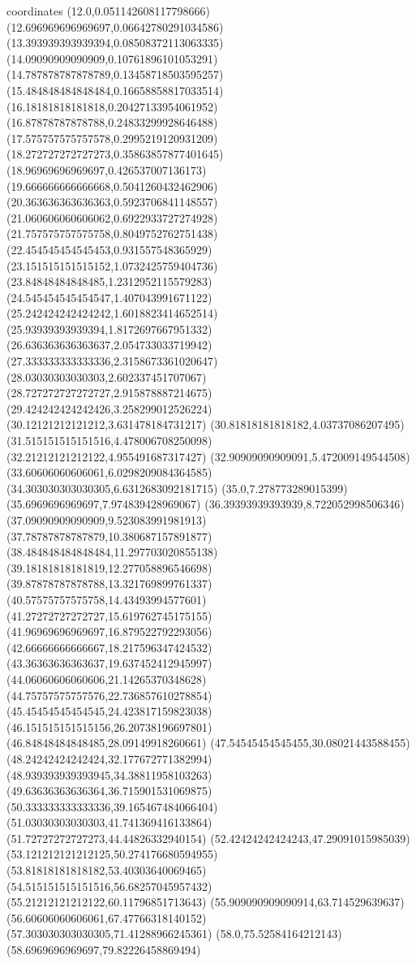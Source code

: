 coordinates {%
(12.0,0.051142608117798666)
(12.696969696969697,0.06642780291034586)
(13.393939393939394,0.08508372113063335)
(14.09090909090909,0.10761896101053291)
(14.787878787878789,0.13458718503595257)
(15.484848484848484,0.16658858817033514)
(16.18181818181818,0.20427133954061952)
(16.87878787878788,0.24833299928646488)
(17.575757575757578,0.2995219120931209)
(18.272727272727273,0.35863857877401645)
(18.96969696969697,0.426537007136173)
(19.666666666666668,0.5041260432462906)
(20.363636363636363,0.5923706841148557)
(21.060606060606062,0.6922933727274928)
(21.757575757575758,0.8049752762751438)
(22.454545454545453,0.931557548365929)
(23.151515151515152,1.0732425759404736)
(23.84848484848485,1.2312952115579283)
(24.545454545454547,1.407043991671122)
(25.242424242424242,1.6018823414652514)
(25.93939393939394,1.8172697667951332)
(26.636363636363637,2.054733033719942)
(27.333333333333336,2.3158673361020647)
(28.03030303030303,2.602337451707067)
(28.727272727272727,2.915878887214675)
(29.424242424242426,3.258299012526224)
(30.12121212121212,3.631478184731217)
(30.81818181818182,4.03737086207495)
(31.515151515151516,4.478006708250098)
(32.21212121212122,4.955491687317427)
(32.90909090909091,5.472009149544508)
(33.60606060606061,6.0298209084364585)
(34.303030303030305,6.6312683092181715)
(35.0,7.278773289015399)
(35.6969696969697,7.974839428969067)
(36.39393939393939,8.722052998506346)
(37.09090909090909,9.523083991981913)
(37.78787878787879,10.380687157891877)
(38.484848484848484,11.297703020855138)
(39.18181818181819,12.277058896546698)
(39.87878787878788,13.321769899761337)
(40.57575757575758,14.43493994577601)
(41.27272727272727,15.619762745175155)
(41.96969696969697,16.879522792293056)
(42.66666666666667,18.217596347424532)
(43.36363636363637,19.637452412945997)
(44.06060606060606,21.14265370348628)
(44.75757575757576,22.736857610278854)
(45.45454545454545,24.423817159823038)
(46.151515151515156,26.20738196697801)
(46.84848484848485,28.09149918260661)
(47.54545454545455,30.08021443588455)
(48.24242424242424,32.177672771382994)
(48.939393939393945,34.38811958103263)
(49.63636363636364,36.715901531069875)
(50.333333333333336,39.165467484066404)
(51.03030303030303,41.741369416133864)
(51.72727272727273,44.44826332940154)
(52.42424242424243,47.29091015985039)
(53.121212121212125,50.274176680594955)
(53.81818181818182,53.40303640069465)
(54.515151515151516,56.68257045957432)
(55.21212121212122,60.11796851713643)
(55.909090909090914,63.714529639637)
(56.60606060606061,67.47766318140152)
(57.303030303030305,71.41288966245361)
(58.0,75.52584164212143)
(58.6969696969697,79.82226458869494)
}
